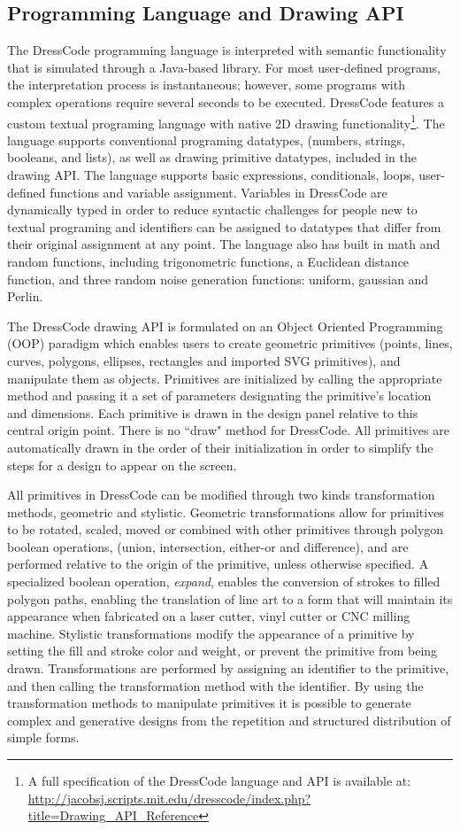 \documentclass{sigchi}
\begin{document}
\subsection{Programming Language and Drawing API}
The DressCode programming language is interpreted with semantic functionality that is simulated through a Java-based library. For most user-defined programs, the interpretation process is instantaneous; however, some programs with complex operations require several seconds to be executed. DressCode features a custom textual programing language with native 2D drawing functionality\footnote{A full specification of the DressCode language and API is available at: \url{http://jacobsj.scripts.mit.edu/dresscode/index.php?title=Drawing_API_Reference}}. The language supports conventional programing datatypes, (numbers, strings, booleans, and lists), as well as drawing primitive datatypes, included in the drawing API. The language supports basic expressions, conditionals, loops, user-defined functions and variable assignment. Variables in DressCode are dynamically typed in order to reduce syntactic challenges for people new to textual programing and identifiers can be assigned to datatypes that differ from their original assignment at any point. The language also has built in math and random functions, including trigonometric functions, a Euclidean distance function, and three random noise generation functions: uniform, gaussian and Perlin. 

The DressCode drawing API is formulated on an Object Oriented Programming (OOP) paradigm which enables users to create geometric primitives (points, lines, curves, polygons, ellipses, rectangles and imported SVG primitives), and manipulate them as objects. Primitives are initialized by calling the appropriate method and passing it a set of parameters designating the primitive's location and dimensions. Each primitive is drawn in the design panel relative to this central origin point. There is no ``draw" method for DressCode. All primitives are automatically drawn in the order of their initialization in order to simplify the steps for a design to appear on the screen.
 
All primitives in DressCode can be modified through two kinds transformation methods, geometric and stylistic. Geometric transformations allow for primitives to be rotated, scaled, moved or combined with other primitives through polygon boolean operations, (union, intersection, either-or and difference), and are performed relative to the origin of the primitive, unless otherwise specified. A specialized boolean operation, \textit{expand},  enables the conversion of strokes to filled polygon paths, enabling the translation of line art to a form that will maintain its appearance when fabricated on a laser cutter, vinyl cutter or CNC milling machine. Stylistic transformations modify the appearance of a primitive by setting the fill and stroke color and weight, or prevent the primitive from being drawn. Transformations are performed by assigning an identifier to the primitive, and then calling the transformation method with the identifier. By using the transformation methods to manipulate primitives it is possible to generate complex and generative designs from the repetition and structured distribution of simple forms. 
\end{document}
